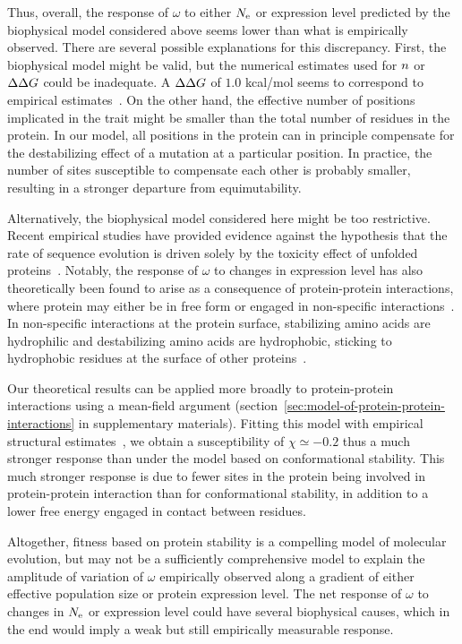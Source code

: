 Thus, overall, the response of $\omega$ to either $N_{\text{e}}$ or expression level predicted by the biophysical model considered above seems lower than what is empirically observed.
There are several possible explanations for this discrepancy.
First, the biophysical model might be valid, but the numerical estimates used for $n$ or $\Delta \Delta G$ could be inadequate.
A $\Delta \Delta G$ of $1.0$ kcal/mol seems to correspond to empirical estimates~\citep{Zeldovich2007}.
On the other hand, the effective number of positions implicated in the trait might be smaller than the total number of residues in the protein.
In our model, all positions in the protein can in principle compensate for the destabilizing effect of a mutation at a particular position.
In practice, the number of sites susceptible to compensate each other is probably smaller, resulting in a stronger departure from equimutability.

Alternatively, the biophysical model considered here might be too restrictive.
Recent empirical studies have provided evidence against the hypothesis that the rate of sequence evolution is driven solely by the toxicity effect of unfolded proteins~\citep{Plata2017,Razban2019,Biesiadecka2020}.
Notably, the response of $\omega$ to changes in expression level has also theoretically been found to arise as a consequence of protein-protein interactions, where protein may either be in free form or engaged in non-specific interactions~\citep{Yang2012, Zhang2013}.
In non-specific interactions at the protein surface, stabilizing amino acids are hydrophilic and destabilizing amino acids are hydrophobic, sticking to hydrophobic residues at the surface of other proteins~\citep{Dixit2013,Manhart2015}.

Our theoretical results can be applied more broadly to protein-protein interactions using a mean-field argument (section~\ref{sec:model-of-protein-protein-interactions} in supplementary materials).
Fitting this model with empirical structural estimates~\citep{Janin1995a, Zhang2008}, we obtain a susceptibility of $\chi \simeq -0.2$ thus a much stronger response than under the model based on conformational stability.
This much stronger response is due to fewer sites in the protein being involved in protein-protein interaction than for conformational stability, in addition to a lower free energy engaged in contact between residues.

Altogether, fitness based on protein stability is a compelling model of molecular evolution, but may not be a sufficiently comprehensive model to explain the amplitude of variation of $\omega$ empirically observed along a gradient of either \gls{effective population size} or protein expression level.
The net response of $\omega$ to changes in $N_{\text{e}}$ or expression level could have several biophysical causes, which in the end would imply a weak but still empirically measurable response.

